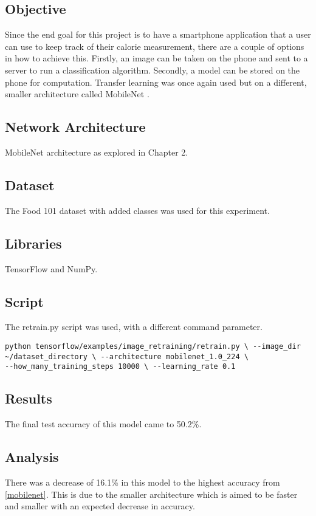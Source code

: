 \subsection*{Objective}
Since the end goal for this project is to have a smartphone
application that a user can use to keep track of their calorie measurement,
there are a couple of options in how to achieve this. Firstly, an image can be
taken on the phone and sent to a server to run a classification algorithm.
Secondly, a model can be stored on the phone for computation. Transfer learning was once again used but on a different, smaller architecture called MobileNet \parencite{mobilenet}.

\subsection*{Network Architecture}
MobileNet architecture as explored in Chapter 2.

\subsection*{Dataset}
The Food 101 dataset \parencite{food101} with added classes was used for this experiment.

\subsection*{Libraries}
TensorFlow and NumPy.

\subsection*{Script}
The retrain.py script \parencite{retrainInception} was used, with a different
command parameter.

\begin{lstlisting}[style=Command]
python tensorflow/examples/image_retraining/retrain.py \ --image_dir
~/dataset_directory \ --architecture mobilenet_1.0_224 \
--how_many_training_steps 10000 \ --learning_rate 0.1
\end{lstlisting}

\subsection*{Results}
The final test accuracy of this model came to 50.2\%.

\subsection*{Analysis}
There was a decrease of 16.1\% in this model to the highest accuracy from
\ref{mobilenet}. This is due to the smaller architecture which is aimed to be faster
and smaller with an expected decrease in accuracy.
